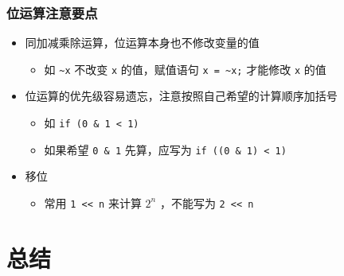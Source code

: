 \begin{frame}[fragile]
    \frametitle{位运算注意要点}

    \begin{itemize}
        \item 同加减乘除运算，位运算本身也不修改变量的值
        
        \begin{itemize}
            \item 如 \lstinline|~x| 不改变 \lstinline|x| 的值，赋值语句 \lstinline|x = ~x;| 才能修改 \lstinline|x| 的值
        \end{itemize}

        \item 位运算的优先级容易遗忘，注意按照自己希望的计算顺序加括号
        
        \begin{itemize}
            \item 如 \lstinline|if (0 & 1 < 1)| 
            \item 如果希望 \lstinline|0 & 1| 先算，应写为 \lstinline|if ((0 & 1) < 1)|
        \end{itemize}

        \item 移位

        \begin{itemize}
            \item 常用 \lstinline|1 << n| 来计算 $2^n$ ，不能写为 \lstinline|2 << n|
        \end{itemize}

    \end{itemize}

\end{frame}


\section{总结}

